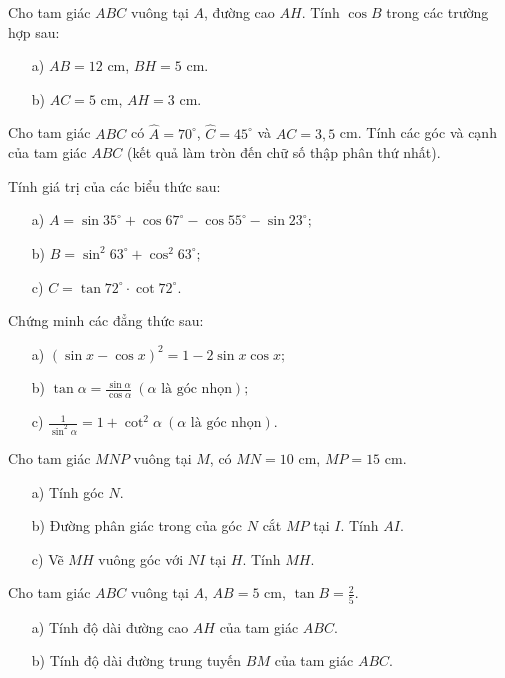 \documentclass[%
    fontsize=12pt,%
    chapterprefix=false,%
    open=right,%
    twoside=false,%
    numbers=noenddot,%
    headings=optiontohead,%
    final,%
    DIV=15,%
    parskip=half %
]{scrbook}
\begin{document}
\begin{tuluan}

\item Cho tam giác $ABC$ vuông tại $A$, đường cao $AH$. Tính $\cos B$ trong các trường hợp sau:
\begin{enumerate}[label=\alph*)]
  \item[a)] $AB = 12$ cm, $BH = 5$ cm.
  \item[b)] $AC = 5$ cm, $AH = 3$ cm.
\end{enumerate}

\item Cho tam giác $ABC$ có $\hat{A} = 70^\circ$, $\hat{C} = 45^\circ$ và $AC = 3,5$ cm. Tính các góc và cạnh của tam giác $ABC$ (kết quả làm tròn đến chữ số thập phân thứ nhất).

\item Tính giá trị của các biểu thức sau:
\begin{enumerate}[label=\alph*)]
  \item[a)] $A = \sin 35^\circ + \cos 67^\circ - \cos 55^\circ - \sin 23^\circ;$
  \item[b)] $B = \sin^2 63^\circ + \cos^2 63^\circ;$
  \item[c)] $C = \tan 72^\circ \cdot \cot 72^\circ.$
\end{enumerate}

\item Chứng minh các đẳng thức sau:
\begin{enumerate}[label=\alph*)]
  \item[a)] $(\sin x - \cos x)^2 = 1 - 2\sin x \cos x;$
  \item[b)] $\tan \alpha = \frac{\sin \alpha}{\cos \alpha}\ (\alpha \text{ là góc nhọn});$
  \item[c)] $\frac{1}{\sin^2 \alpha} = 1 + \cot^2 \alpha\ (\alpha \text{ là góc nhọn}).$
\end{enumerate}

\item Cho tam giác $MNP$ vuông tại $M$, có $MN = 10$ cm, $MP = 15$ cm.
\begin{enumerate}[label=\alph*)]
  \item[a)] Tính góc $N$.
  \item[b)] Đường phân giác trong của góc $N$ cắt $MP$ tại $I$. Tính $AI$.
  \item[c)] Vẽ $MH$ vuông góc với $NI$ tại $H$. Tính $MH$.
\end{enumerate}

\item Cho tam giác $ABC$ vuông tại $A$, $AB = 5$ cm, $\tan B = \frac{2}{5}$.
\begin{enumerate}[label=\alph*)]
  \item[a)] Tính độ dài đường cao $AH$ của tam giác $ABC$.
  \item[b)] Tính độ dài đường trung tuyến $BM$ của tam giác $ABC$.
\end{enumerate}


\end{tuluan}
\end{document}

